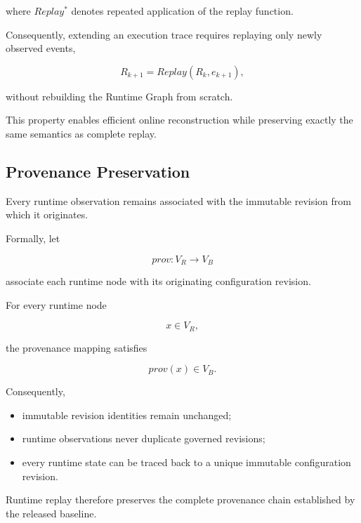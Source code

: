 \documentclass[10pt]{article}
\begin{document}
	where $Replay^*$ denotes repeated application of the replay function.
	
	Consequently, extending an execution trace requires replaying only newly
	observed events,
	
	\begin{equation}
		R_{k+1}
		=
		Replay(R_k,e_{k+1}),
	\end{equation}
	
	without rebuilding the Runtime Graph from scratch.
	
	This property enables efficient online reconstruction while preserving exactly
	the same semantics as complete replay.
	
	\subsection{Provenance Preservation}
	\label{appendix:runtime_provenance}
	
	Every runtime observation remains associated with the immutable revision from
	which it originates.
	
	Formally, let
	
	\begin{equation}
		prov
		:
		V_R
		\rightarrow
		V_B
	\end{equation}
	
	associate each runtime node with its originating configuration revision.
	
	For every runtime node
	
	\[
	x\in V_R,
	\]
	
	the provenance mapping satisfies
	
	\begin{equation}
		prov(x)
		\in
		V_B.
	\end{equation}
	
	Consequently,
	
	\begin{itemize}
		\item immutable revision identities remain unchanged;
		\item runtime observations never duplicate governed revisions;
		\item every runtime state can be traced back to a unique immutable
		configuration revision.
	\end{itemize}
	
	Runtime replay therefore preserves the complete provenance chain established by
	the released baseline.
	
\end{document}
